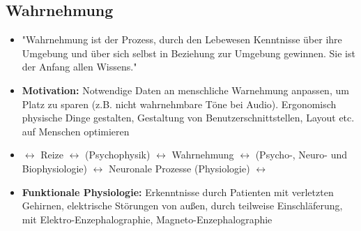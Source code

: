 \documentclass[12pt,landscape]{article}
\begin{document}
\begin{multicols}{3}
\section{Wahrnehmung}
\begin{itemize}
\item "Wahrnehmung ist der Prozess, durch den Lebewesen Kenntnisse über ihre Umgebung und über sich selbst in Beziehung zur Umgebung gewinnen. Sie ist der Anfang allen Wissens."
\item \textbf{Motivation:} Notwendige Daten an menschliche Warnehmung anpassen, um Platz zu sparen (z.B. nicht wahrnehmbare Töne bei Audio). Ergonomisch physische Dinge gestalten, Gestaltung von Benutzerschnittstellen, Layout etc. auf Menschen optimieren
\item $\leftrightarrow$ Reize $\leftrightarrow$ (Psychophysik) $\leftrightarrow$ Wahrnehmung $\leftrightarrow$ (Psycho-, Neuro- und Biophysiologie) $\leftrightarrow$ Neuronale Prozesse (Physiologie) $\leftrightarrow$
\item \textbf{Funktionale Physiologie:} Erkenntnisse durch Patienten mit verletzten Gehirnen, elektrische Störungen von außen, durch teilweise Einschläferung, mit Elektro-Enzephalographie, Magneto-Enzephalographie
\end{itemize}

\end{multicols}
\end{document}
